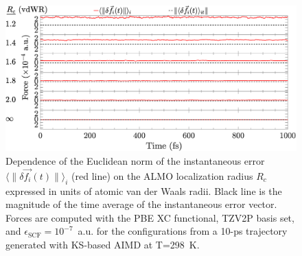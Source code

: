 \documentclass[aps,prl,reprint,amsmath,amssymb]{revtex4-1}
\begin{document}



\else

%

\begin{figure}[h!]
\includegraphics[trim={0cm 0cm 0.1cm 0.1cm},clip,width=\textwidth]{DeltaForceComparison_ALMO_SCF.eps}
\caption{\label{fig:forcecomp} Dependence of the Euclidean norm of the instantaneous error $\langle \| \delta \vec{f_{i}}(t) \| \rangle_{i}$ (red line) on the ALMO localization radius $R_c$ expressed in units of atomic van der Waals radii. Black line is the magnitude of the time average of the instantaneous error vector. %
Forces are computed with the PBE XC functional, TZV2P basis set, and $\epsilon_{\text{SCF}} = 10^{-7}$~a.u. for the configurations from a 10-ps trajectory generated with KS-based AIMD at T=298~K.}
\end{figure}
\end{document}

